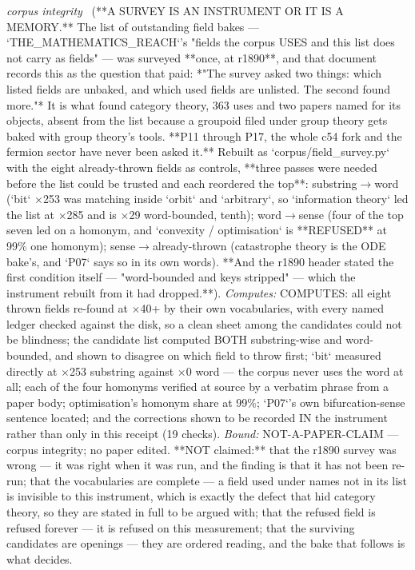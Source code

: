 \begin{description}
\textit{corpus integrity} \ (**A SURVEY IS AN INSTRUMENT OR IT IS A MEMORY.** The list of outstanding field bakes --- `THE\_MATHEMATICS\_REACH`'s "fields the corpus USES and this list does not carry as fields" --- was surveyed **once, at r1890**, and that document records this as the question that paid: *"The survey asked two things: which listed fields are unbaked, and which used fields are unlisted. The second found more."* It is what found category theory, 363 uses and two papers named for its objects, absent from the list because a groupoid filed under group theory gets baked with group theory's tools. **P11 through P17, the whole c54 fork and the fermion sector have never been asked it.** Rebuilt as `corpus/field\_survey.py` with the eight already-thrown fields as controls, **three passes were needed before the list could be trusted and each reordered the top**: substring\ensuremath{\to}word (`bit` \ensuremath{\times}253 was matching inside `orbit` and `arbitrary`, so `information theory` led the list at \ensuremath{\times}285 and is \ensuremath{\times}29 word-bounded, tenth); word\ensuremath{\to}sense (four of the top seven led on a homonym, and `convexity / optimisation` is **REFUSED** at 99\% one homonym); sense\ensuremath{\to}already-thrown (catastrophe theory is the ODE bake's, and `P07` says so in its own words). **And the r1890 header stated the first condition itself --- "word-bounded and keys stripped" --- which the instrument rebuilt from it had dropped.**). 
\emph{Computes:} COMPUTES: all eight thrown fields re-found at \ensuremath{\times}40+ by their own vocabularies, with every named ledger checked against the disk, so a clean sheet among the candidates could not be blindness; the candidate list computed BOTH substring-wise and word-bounded, and shown to disagree on which field to throw first; `bit` measured directly at \ensuremath{\times}253 substring against \ensuremath{\times}0 word --- the corpus never uses the word at all; each of the four homonyms verified at source by a verbatim phrase from a paper body; optimisation's homonym share at 99\%; `P07`'s own bifurcation-sense sentence located; and the corrections shown to be recorded IN the instrument rather than only in this receipt (19 checks).
 \emph{Bound:} NOT-A-PAPER-CLAIM --- corpus integrity; no paper edited. **NOT claimed:** that the r1890 survey was wrong --- it was right when it was run, and the finding is that it has not been re-run; that the vocabularies are complete --- a field used under names not in its list is invisible to this instrument, which is exactly the defect that hid category theory, so they are stated in full to be argued with; that the refused field is refused forever --- it is refused on this measurement; that the surviving candidates are openings --- they are ordered reading, and the bake that follows is what decides.

\end{description}
